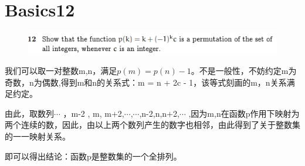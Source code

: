 \documentclass[]{article}
\begin{document}
\section*{Basics12}
\begin{figure}[H]
	\includegraphics[scale=1]{Q2}
\end{figure}
我们可以取一对整数m,n，满足$p(m) = p(n) - 1$。不是一般性，不妨约定m为奇数，n为偶数,得到m和n的关系式：m = n + 2c - 1，该等式刻画的m，n关系满足约定。\par 
由此，取数列{$\cdots$ ，m-2 , m, m+2,$\cdots$},{$\cdots$,n-2,n,n+2,$\cdots$ },因为m,n在函数p作用下映射为两个连续的数，因此，由以上两个数列产生的数字也相邻，由此得到了关于整数集的一一映射关系。\par 
即可以得出结论：函数p是整数集的一个全排列。
\end{document}
